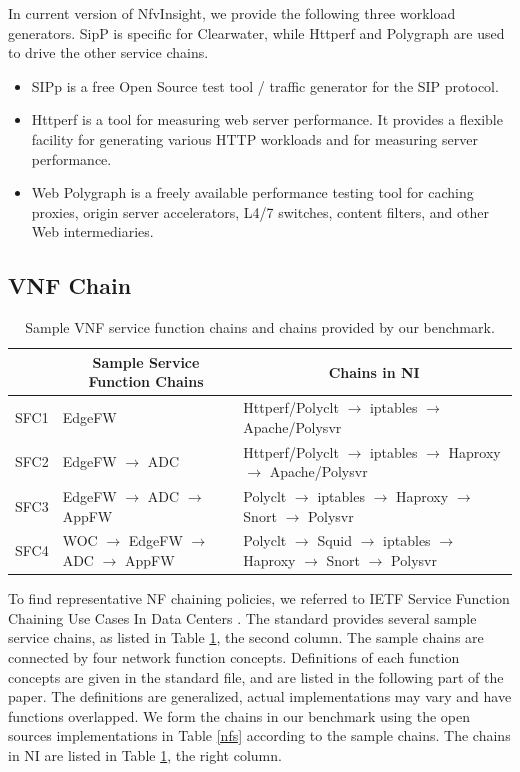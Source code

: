 In current version of NfvInsight, we provide the following three workload generators.
SipP is specific for Clearwater,
while Httperf and Polygraph are used to drive the other service chains.
\begin{itemize}
\item{}
SIPp \cite{SIPp}
is a free Open Source test tool / traffic generator for the SIP protocol.
\item{}
Httperf \cite{Httperf}
is a tool for measuring web server performance. It provides a flexible facility for generating various HTTP workloads and for measuring server performance.
\item{}
Web Polygraph \cite{web-polygraph}
is a freely available performance testing tool for caching proxies, origin server accelerators, L4/7 switches, content filters, and other Web intermediaries.
\end{itemize}

\subsection{VNF Chain}

\begin{table}[!htbp]
\newcommand{\tabincell}[2]{\begin{tabular}{@{}#1@{}}#2\end{tabular}}
\centering
\begin{tabular}{|l|l|l|}\hline
\textbf{} & \multicolumn{1}{c|}{\textbf{Sample Service Function Chains}} & \multicolumn{1}{c|}{\textbf{Chains in NI}} \\\hline
SFC1 & EdgeFW & Httperf/Polyclt $\to$ iptables $\to$ Apache/Polysvr \\\hline
SFC2 & EdgeFW $\to$ ADC & Httperf/Polyclt $\to$ iptables $\to$ Haproxy $\to$ Apache/Polysvr \\\hline
SFC3 & EdgeFW $\to$ ADC $\to$ AppFW & Polyclt $\to$ iptables $\to$ Haproxy $\to$ Snort $\to$ Polysvr \\\hline
SFC4 & WOC $\to$ EdgeFW $\to$ ADC $\to$ AppFW & Polyclt $\to$  Squid $\to$ iptables $\to$ Haproxy $\to$ Snort $\to$ Polysvr \\\hline
\end{tabular}
\caption{Sample VNF service function chains and chains provided by our benchmark.}
\label{chains}
\end{table}

To find representative NF chaining policies,
we referred to IETF Service Function Chaining Use Cases
In Data Centers \cite{draft-ietf-sfc-dc-use-cases-06}.
The standard provides several sample service chains,
as listed in Table \ref{chains}, the second column.
The sample chains are connected by four network function concepts.
Definitions of each function concepts are given in the standard file,
and are listed in the following part of the paper.
The definitions are generalized,
actual implementations may vary and have functions overlapped.
We form the chains in our benchmark using the open sources
implementations in Table \ref{nfs} according to the sample chains.
The chains in NI are listed in Table \ref{chains}, the right column.


